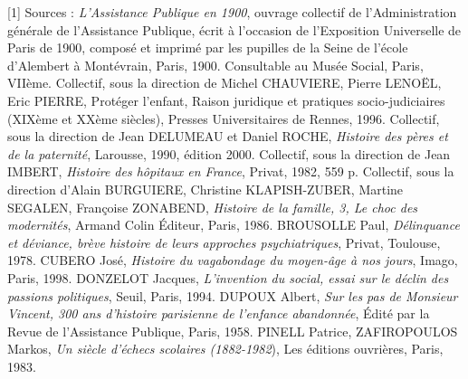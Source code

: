 [1] Sources : \emph{L'Assistance Publique en 1900}, ouvrage collectif de l'Administration générale de l'Assistance Publique, écrit à l'occasion de l'Exposition Universelle de Paris de 1900, composé et imprimé par les pupilles de la Seine de l'école d'Alembert à Montévrain, Paris, 1900. Consultable au Musée Social, Paris, VIIème. Collectif, sous la direction de Michel CHAUVIERE, Pierre LENOËL, Eric PIERRE, Protéger l'enfant, Raison juridique et pratiques socio-judiciaires (XIXème et XXème siècles), Presses Universitaires de Rennes, 1996. Collectif, sous la direction de Jean DELUMEAU et Daniel ROCHE, \emph{Histoire des pères et de la paternité}, Larousse, 1990, édition 2000. Collectif, sous la direction de Jean IMBERT, \emph{Histoire des hôpitaux en France}, Privat, 1982, 559 p. Collectif, sous la direction d'Alain BURGUIERE, Christine KLAPISH-ZUBER, Martine SEGALEN, Françoise ZONABEND, \emph{Histoire de la famille, 3, Le choc des modernités}, Armand Colin Éditeur, Paris, 1986. BROUSOLLE Paul, \emph{Délinquance et déviance, brève histoire de leurs approches psychiatriques}, Privat, Toulouse, 1978. CUBERO José, \emph{Histoire du vagabondage du moyen-âge à nos jours}, Imago, Paris, 1998. DONZELOT Jacques, \emph{L'invention du social, essai sur le déclin des passions politiques}, Seuil, Paris, 1994. DUPOUX Albert, \emph{Sur les pas de Monsieur Vincent, 300 ans d'histoire parisienne de l'enfance abandonnée}, Édité par la Revue de l'Assistance Publique, Paris, 1958. PINELL Patrice, ZAFIROPOULOS Markos, \emph{Un siècle d'échecs scolaires (1882-1982}), Les éditions ouvrières, Paris, 1983.